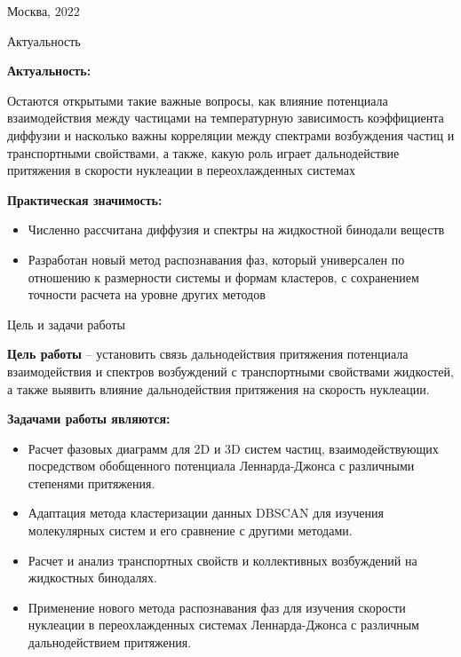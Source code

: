\documentclass{beamer} %
\begin{document}
\begin{frame}
  \vspace{0.5cm}
  \begin{center}\tiny
    Москва, $2022$
  \end{center}
\end{frame}




\begin{frame}{Актуальность}
  \footnotesize{

    \textbf{Актуальность:}

    Остаются открытыми такие важные вопросы, как влияние потенциала взаимодействия между частицами на температурную зависимость коэффициента диффузии и насколько важны корреляции между спектрами возбуждения частиц и транспортными свойствами, а также, какую роль играет дальнодействие притяжения в скорости нуклеации в переохлажденных системах

    \vspace{1cm}

    \textbf{Практическая значимость:}

    \begin{itemize}
    \item Численно рассчитана диффузия и спектры на жидкостной бинодали веществ
    \item Разработан новый метод распознавания фаз, который универсален по отношению к размерности системы и формам кластеров, с сохранением точности расчета на уровне других методов
    \end{itemize}
  }
\end{frame}




\begin{frame}{Цель и задачи работы}
  \footnotesize{

    \textbf{Цель работы} -- установить связь дальнодействия притяжения потенциала взаимодействия и спектров возбуждений с транспортными свойствами жидкостей, а также выявить влияние дальнодействия притяжения на скорость нуклеации.

    \vspace{0.5cm}

    \textbf{Задачами работы являются:}
    \begin{itemize}
    \item Расчет фазовых диаграмм для 2D и 3D систем частиц, взаимодействующих посредством обобщенного потенциала Леннарда-Джонса с различными степенями притяжения.
    \item Адаптация метода кластеризации данных DBSCAN для изучения молекулярных систем и его сравнение с другими методами.
    \item Расчет и анализ транспортных свойств и коллективных возбуждений на жидкостных бинодалях.
    \item Применение нового метода распознавания фаз для изучения скорости нуклеации в переохлажденных системах Леннарда-Джонса с различным дальнодействием притяжения.
    \end{itemize}
  }
\end{frame}
\end{document}
